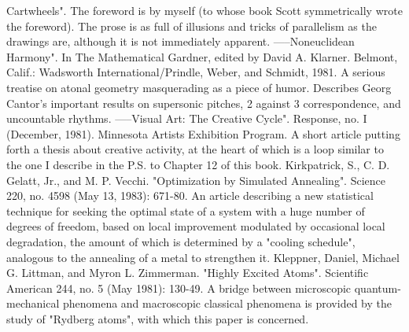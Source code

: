   Cartwheels". The foreword is by myself (to whose book Scott symmetrically wrote the
  foreword). The prose is as full of illusions and tricks of parallelism as the drawings are,
  although it is not immediately apparent.
-----Noneuclidean Harmony". In The Mathematical Gardner, edited by David A. Klarner.
  Belmont, Calif.: Wadsworth International/Prindle, Weber, and Schmidt, 1981. A serious
  treatise on atonal geometry masquerading as a piece of humor. Describes Georg Cantor's
  important results on supersonic pitches, 2 against 3 correspondence, and uncountable
  rhythms.
-----Visual Art: The Creative Cycle". Response, no. I (December, 1981). Minnesota Artists
  Exhibition Program. A short article putting forth a thesis about creative activity, at the heart
  of which is a loop similar to the one I describe in the P.S. to Chapter 12 of this book.
Kirkpatrick, S., C. D. Gelatt, Jr., and M. P. Vecchi. "Optimization by Simulated Annealing".
  Science 220, no. 4598 (May 13, 1983): 671-80. An article describing a new statistical
  technique for seeking the optimal state of a system with a huge number of degrees of
  freedom, based on local improvement modulated by occasional local degradation, the
  amount of which is determined by a "cooling schedule", analogous to the annealing of a
  metal to strengthen it.
Kleppner, Daniel, Michael G. Littman, and Myron L. Zimmerman. "Highly Excited Atoms".
  Scientific American 244, no. 5 (May 1981): 130-49. A bridge between microscopic
  quantum-mechanical phenomena and macroscopic classical phenomena is provided by the
  study of "Rydberg atoms", with which this paper is concerned.



